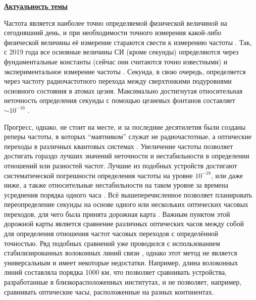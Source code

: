 
{\actuality} 

\underline{\textbf{Актуальность темы}}

Частота является наиболее точно определяемой физической величиной на сегодняшний день, и при необходимости точного измерения какой-либо физической величины её измерение стараются свести к измерению частоты \cite{Riehle2009}.
Так, с 2019 года все основные величины СИ (кроме секунды) определяются через фундаментальные константы (сейчас они считаются точно известными) и экспериментальное измерение частоты \cite{BIPM2024}.
Секунда, в свою очередь, определяется через частоту радиочастотного перехода между сверхтонкими подуровнями основного состояния в атомах цезия.
Максимально достигнутая относительная неточность определения секунды с помощью цезиевых фонтанов составляет $\sim 10^{-16}$ \cite{petit2015international}. 

Прогресс, однако, не стоит на месте, и за последние десятилетия были созданы реперы частоты, в которых ``маятником'' служат не радиочастотные, а оптические переходы в различных квантовых системах \cite{ludlow2015optical}. 
Увеличение частоты позволяет достигать гораздо лучших значений неточности и нестабильности в определении отношений или разностей частот.
Лучшие из подобных устройств достигают систематической погрешности определения частоты на уровне $10^{-18}$, или даже ниже, а также относительные нестабильности на таком уровне за времена усреднения порядка одного часа \cite{brewer2019al+, bothwell2019jila, bloom2014optical}.
Всё вышеперечисленное позволяет планировать переопределение секунды на основе одного или нескольких оптических часовых переходов, для чего была принята дорожная карта \cite{dimarcq2024roadmap}.
Важным пунктом этой дорожной карты является сравнение различных оптических часов между собой для определения отношения частот часовых переходов с определённой точностью.
Ряд подобных сравнений уже проводился с использованием стабилизированных волоконных линий связи \cite{riehle2017optical, predehl2012920}, однако этот метод не является универсальным и имеет некоторые недостатки.
Например, длина волоконных линий составляла порядка 1000 км, что позволяет сравнивать устройства, разработанные в близкорасположенных институтах, и не позволяет, например, сравнивать оптические часы, расположенные на разных континентах.

